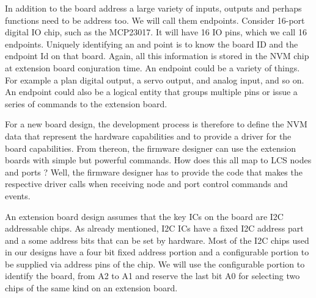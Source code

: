 In addition to the board address a large variety of inputs, outputs and perhaps functions need to be address too. We will call them endpoints. Consider  16-port digital IO chip, such as the MCP23017. It will have 16 IO pins, which we call 16 endpoints. Uniquely identifying an and point is to know the board ID and the endpoint Id on that board. Again, all this information is stored in the NVM  chip at extension board conjuration time. An endpoint could be a variety of things. For example a plan digital output, a servo output, and analog input, and so on. An endpoint could also be a logical entity that groups multiple pins or issue a series of commands to the extension board.

For a new board design, the development process is therefore to define the NVM data that represent the hardware capabilities  and to provide a driver for the board capabilities. From thereon, the firmware designer can use the extension boards with simple but powerful commands. How does this all map to LCS nodes and ports ? Well, the firmware designer has to provide the code that makes the respective driver calls when receiving node and port control commands and events.


An extension board design assumes that the key ICs on the board are I2C addressable chips. As already mentioned, I2C ICs have a fixed I2C address part and a some address bits that can be set by hardware. Most of the I2C chips used in our designs have a four bit fixed address portion and a configurable portion to be supplied via address pins of the chip. We will use the configurable portion to identify the board, from A2 to A1 and reserve the last bit A0 for selecting two chips of the same kind on an extension board.

